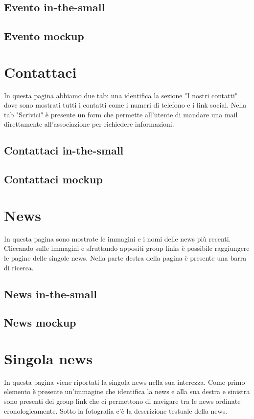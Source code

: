         \subsection{Evento in-the-small}

        \subsection{Evento mockup}

    \section{Contattaci}
    In questa pagina abbiamo due tab: una identifica la sezione "I nostri
    contatti" dove sono mostrati tutti i contatti come i numeri di telefono e i
    link social. Nella tab "Scrivici" è presente un form che permette all'utente
    di mandare una mail direttamente all'associazione per richiedere informazioni.

        \subsection{Contattaci in-the-small}

        \subsection{Contattaci mockup}
    
    \section{News}
    In questa pagina sono mostrate le immagini e i nomi delle news più recenti.
    Cliccando sulle immagini e sfruttando appositi group links è possibile
    raggiungere le pagine delle singole news.
    Nella parte destra della pagina è presente una barra di ricerca.

        \subsection{News in-the-small}

        \subsection{News mockup}
    
    \section{Singola news}
    In questa pagina viene riportati la singola news nella sua interezza. Come
    primo elemento è presente un'immagine che identifica la news e alla sua
    destra e sinistra sono presenti dei group link che ci permettono di navigare
    tra le news ordinate cronologicamente.
    Sotto la fotografia c'è la descrizione testuale della news.

